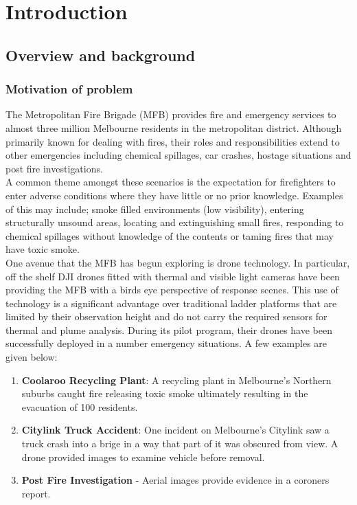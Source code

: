 \documentclass[capstone_report.tex]{subfiles}
\begin{document}
\chapter{Introduction}

\section{Overview and background}

\subsection{Motivation of problem}
The Metropolitan Fire Brigade (MFB) provides fire and emergency services to almost three million Melbourne residents in the metropolitan district.  Although primarily known for dealing with fires, their roles and responsibilities extend to other emergencies including chemical spillages, car crashes, hostage situations and post fire investigations.\\

A common theme amongst these scenarios is the expectation for firefighters to enter adverse conditions where they have little or no prior knowledge. Examples of this may include; smoke filled environments (low visibility), entering structurally unsound areas, locating and extinguishing small fires, responding to chemical spillages without knowledge of the contents or taming fires that may have toxic smoke.\\

One avenue that the MFB has begun exploring is drone technology.  In particular, off the shelf DJI drones fitted with thermal and visible light cameras have been providing the MFB with a birds eye perspective of response scenes. This use of technology is a significant advantage over traditional ladder platforms that are limited by their observation height and do not carry the required sensors for thermal and plume analysis. During its pilot program, their drones have been successfully deployed in a number emergency situations. A few examples are given below:
\begin{enumerate}
    \item \textbf{Coolaroo Recycling Plant}: A recycling plant in Melbourne's Northern suburbs caught fire releasing toxic smoke ultimately resulting in the evacuation of 100 residents.
    \item \textbf{Citylink Truck Accident}: One incident on Melbourne's Citylink saw a truck crash into a brige in a way that part of it was obscured from view. A drone provided images to examine vehicle before removal.
    \item \textbf{Post Fire Investigation}  - Aerial images provide evidence in a coroners report.
\end{enumerate}
\end{document}
